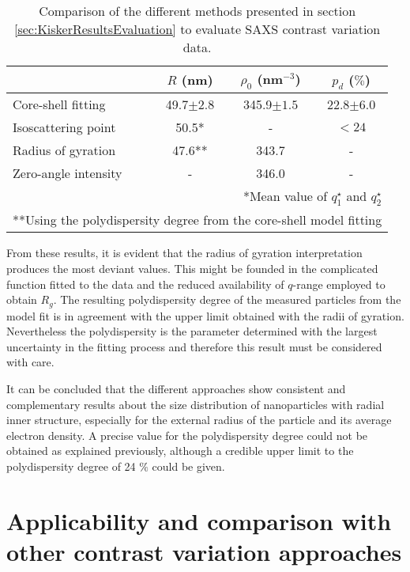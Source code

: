 \begin{table}
\caption[The different evaluation methods of contrast variation SAXS data.]{Comparison of the different methods presented in section \ref{sec:KiskerResultsEvaluation} to evaluate SAXS contrast variation data.}
\begin{tabular}{l|ccc}
 & \( R\) (nm)    & \(\rho_0\) (nm\(^{-3}\)) & \(p_d\) (\(\%\))\\
\hline
 Core-shell fitting &  49.7\(\pm 2.8\)   &     345.9\(\pm 1.5\)      & 22.8\(\pm 6.0\) \\
 Isoscattering point &  50.5* &     -          & $<24$  \\
 Radius of gyration &  47.6**      &     343.7      & -    \\
 Zero-angle intensity &  -    &     346.0      & -    \\ \hline
\multicolumn{4}{r}{*Mean value of \(q^{\star}_1\) and \(q^{\star}_2\)}\\  
\multicolumn{4}{r}{**Using the polydispersity degree from the core-shell model fitting}\\ 
\end{tabular}
\label{tab:comparison_results_Kisker}
\end{table}

From these results, it is evident that the radius of gyration interpretation produces the most deviant values. This might be founded in the complicated function fitted to the data and the reduced availability of $q$-range employed to obtain \( R_g \). The resulting polydispersity degree of the measured particles from the model fit is in agreement with the upper limit obtained with the radii of gyration. Nevertheless the polydispersity is the parameter determined with the largest uncertainty in the fitting process and therefore this result must be considered with care.

It can be concluded that the different approaches show consistent and complementary results about the size distribution of nanoparticles with radial inner structure, especially for the external radius of the particle and its average electron density. A precise value for the polydispersity degree could not be obtained as explained previously, although a credible upper limit to the polydispersity degree of 24 $\%$ could be given.

\section{Applicability and comparison with other contrast variation approaches}
\label{sec:applicability}

